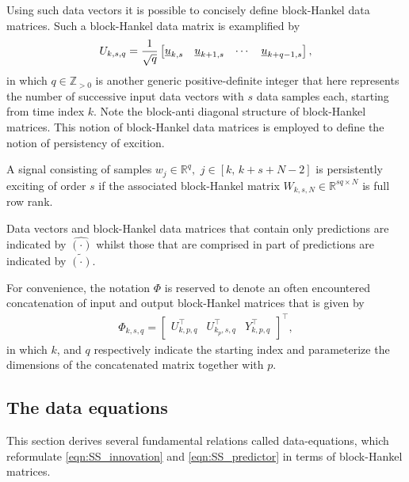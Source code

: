 Using such data vectors it is possible to concisely define block-Hankel data matrices. Such a block-Hankel data matrix is examplified by
\begin{align*}
    U_{k,s,q} = \frac{1}{\sqrt{q}}\begin{bmatrix}
        \underline{u}_{k,s} & \underline{u}_{k+1,s} & \cdots & \underline{u}_{k+q-1,s}
    \end{bmatrix},
\end{align*}
in which $q\in\mathbb{Z}_{>0}$ is another generic positive-definite integer that here represents the number of successive input data vectors with $s$ data samples each, starting from time index $k$. Note the block-anti diagonal structure of block-Hankel matrices. This notion of block-Hankel data matrices is employed to define the notion of persistency of excition.
\begin{defn}\label{def:PE}
    A signal consisting of samples ${w_j\in\mathbb{R}^q},$ $j\in[k,\,k+s+N-2]$ is persistently exciting of order $s$ if the associated block-Hankel matrix ${W_{k,s,N}\in\mathbb{R}^{sq \times N}}$ is full row rank.
\end{defn}
Data vectors and block-Hankel data matrices that contain only predictions are indicated by $\hat{(\cdot)}$ whilst those that are comprised in part of predictions are indicated by $\tilde{(\cdot)}$.

For convenience, the notation $\Phi$ is reserved to denote an often encountered concatenation of input and output block-Hankel matrices that is given by
\begin{align*}
    \Phi_{k,s,q} = \begin{bmatrix}
        U_{k,p,q}^\top & U_{k_p,s,q}^\top & Y_{k,p,q}^\top
    \end{bmatrix}^\top,
\end{align*}
in which $k$, and $q$ respectively indicate the starting index and parameterize the dimensions of the concatenated matrix together with $p$.
% 
\subsection{The data equations}\label{sec:DerivingDataEquations}
This section derives several fundamental relations called data-equations, which reformulate \eqref{eqn:SS_innovation} and \eqref{eqn:SS_predictor} in terms of block-Hankel matrices.

